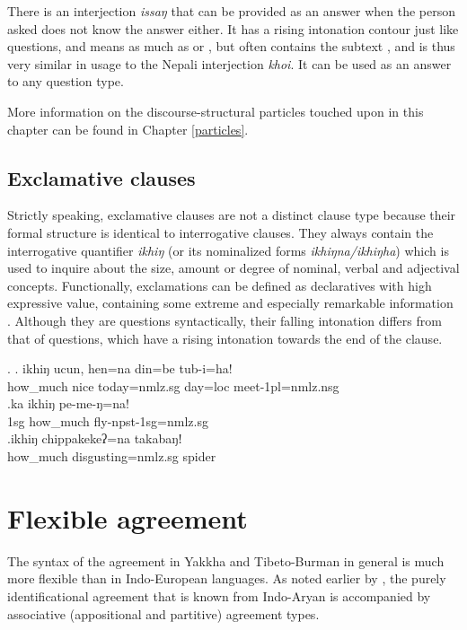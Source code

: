 There is an interjection \emph{issaŋ} that can be provided as an answer when the person asked does not know the answer either. It has a rising intonation contour just like questions, and means as much as  or , but often contains the subtext , and is thus very similar in usage to the Nepali interjection \emph{khoi}. It can be used as an answer to any question type.

More information on the discourse-structural particles touched upon in this chapter can be found in Chapter \ref{particles}.

\subsection{Exclamative clauses}

Strictly speaking, exclamative clauses are not a distinct clause type because their formal structure is identical to interrogative clauses. They always contain the interrogative quantifier \emph{ikhiŋ} (or its nominalized forms \emph{ikhiŋna/ikhiŋha}) which is used to inquire about the size, amount or degree of nominal, verbal and adjectival concepts. Functionally, exclamations can be defined as declaratives with high expressive value, containing some extreme and especially remarkable information \citep[316]{Koenig2007_Speech}. Although they are questions syntactically, their falling intonation differs from that of questions, which have a rising intonation towards the end of the clause.

\ex. \ag. ikhiŋ   ucun, hen=na din=be    tub-i=ha!\\
how\_much nice today{\sc =nmlz.sg} day{\sc =loc} meet{\sc -1pl=nmlz.nsg}\\
 
\bg.ka  ikhiŋ   pe-me-ŋ=na!\\
{\sc 1sg} how\_much fly{\sc -npst-1sg=nmlz.sg}\\
 
\bg.ikhiŋ chippakekeʔ=na takabaŋǃ\\
how\_much disgusting{\sc =nmlz.sg} spider\\

\section{Flexible agreement}\label{flex-agr}

The syntax of the agreement in Yakkha and Tibeto-Burman in general is much more flexible than in Indo-European languages. As noted earlier by \cite{Bickel2000On-the-syntax}, the purely identificational agreement that is known from Indo-Aryan is accompanied by associative (appositional and partitive) agreement types. 

